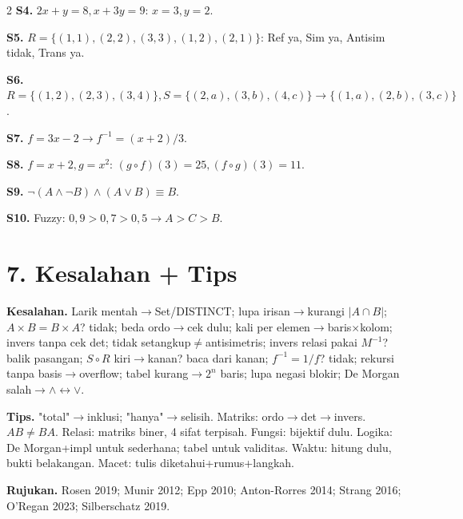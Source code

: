 \documentclass[8pt,a4paper]{extarticle}
\newcommand{\h}[1]{\textbf{#1}}
\begin{document}
\begin{multicols*}{2}
	\h{S4.} $2x{+}y{=}8,x{+}3y{=}9$: $x{=}3,y{=}2$.

	\h{S5.} $R{=}\{(1,1),(2,2),(3,3),(1,2),(2,1)\}$: Ref ya, Sim ya, Antisim tidak, Trans ya.

	\h{S6.} $R{=}\{(1,2),(2,3),(3,4)\},S{=}\{(2,a),(3,b),(4,c)\}\to\{(1,a),(2,b),(3,c)\}$.

	\h{S7.} $f{=}3x{-}2\to f^{-1}{=}(x{+}2)/3$.

	\h{S8.} $f{=}x{+}2,g{=}x^2$: $(g\circ f)(3){=}25,(f\circ g)(3){=}11$.

	\h{S9.} $\neg(A\wedge\neg B)\wedge(A\vee B){\equiv}B$.

	\h{S10.} Fuzzy: $0{,}9>0{,}7>0{,}5\to A>C>B$.

	\section*{7. Kesalahan + Tips}

	\h{Kesalahan.} Larik mentah$\to$Set/DISTINCT; lupa irisan$\to$kurangi $|A\cap B|$; $A\times B{=}B\times A$? tidak; beda ordo$\to$cek dulu; kali per elemen$\to$baris$\times$kolom; invers tanpa cek det; tidak setangkup$\neq$antisimetris; invers relasi pakai $M^{-1}$? balik pasangan; $S\circ R$ kiri$\to$kanan? baca dari kanan; $f^{-1}{=}1/f$? tidak; rekursi tanpa basis$\to$overflow; tabel kurang$\to$$2^n$ baris; lupa negasi blokir; De Morgan salah$\to$$\wedge\leftrightarrow\vee$.

			\h{Tips.} "total"$\to$inklusi; "hanya"$\to$selisih. Matriks: ordo$\to$det$\to$invers. $AB\neq BA$. Relasi: matriks biner, 4 sifat terpisah. Fungsi: bijektif dulu. Logika: De Morgan+impl untuk sederhana; tabel untuk validitas. Waktu: hitung dulu, bukti belakangan. Macet: tulis diketahui+rumus+langkah.

	\h{Rujukan.} Rosen 2019; Munir 2012; Epp 2010; Anton-Rorres 2014; Strang 2016; O'Regan 2023; Silberschatz 2019.

\end{multicols*}
\end{document}
